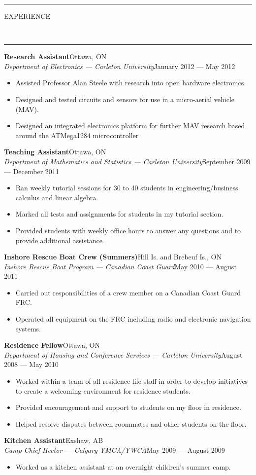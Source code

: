 \documentclass[10pt, letterpaper, oneside]{article}
\newcommand{\HRule}[2]{\textcolor{#1}{\rule{\linewidth}{#2}}}
\newcommand{\sectiontitle}[1]{\begin{minipage}{\textwidth}\HRule{black}{0.25mm}\vspace{-10pt}\begin{center}\Large\MakeUppercase{#1}\end{center}\end{minipage}\\\HRule{light-grey}{0.15mm}\vspace{\baselineskip}}
\newenvironment{ressection}[1]{
  \sectiontitle{#1}}
  {\vspace{-\baselineskip}}
\newcommand{\resitem}[1]{
    \vspace{2pt}
    \item \begin{flushleft} #1 \end{flushleft}
}
\newcommand{\resentryheader}[4]{
    \vspace{-5pt}
    \textbf{#1}\hspace{\stretch{1}}\textcolor{light-grey}{#3}\\
    \textit{#2}\hspace{\stretch{1}}\textcolor{light-grey}{#4}\\
}
\newenvironment{resentry}[4]{
  \begin{minipage}{\textwidth}
    \resentryheader{#1}{#2}{#3}{#4}
        \vspace{-\baselineskip}
    \begin{itemize}[noitemsep,nolistsep]
}{
    \end{itemize}
        \vspace{\baselineskip}
        \end{minipage}
}
\begin{document}
\begin{ressection}{experience}
  \begin{resentry}{Research Assistant}{Department of Electronics --- Carleton University}{Ottawa, ON}{January 2012 --- May 2012}
    \resitem{Assisted Professor Alan Steele with research into open hardware electronics.}
    \resitem{Designed and tested circuits and sensors for use in a micro-aerial vehicle (MAV).}
    \resitem{Designed an integrated electronics platform for further MAV research based around the ATMega1284 microcontroller}
  \end{resentry}
 
  \begin{resentry}{Teaching Assistant}{Department of Mathematics and Statistics --- Carleton University}{Ottawa, ON}{September 2009 --- December 2011}
    \resitem{Ran weekly tutorial sessions for 30 to 40 students in engineering/business calculus and linear algebra.}
    \resitem{Marked all tests and assignments for students in my tutorial section.}
    \resitem{Provided students with weekly office hours to answer any questions and to provide additional assistance.}
  \end{resentry}
 
  \begin{resentry}{Inshore Rescue Boat Crew (Summers)}{Inshore Rescue Boat Program --- Canadian Coast Guard}{Hill Is. and Brebeuf Is., ON}{May 2010 --- August 2011}
    \resitem{Carried out responsibilities of a crew member on a Canadian Coast Guard FRC.}
    \resitem{Operated all equipment on the FRC including radio and electronic navigation systems.}
  \end{resentry}
 
  \begin{resentry}{Residence Fellow}{Department of Housing and Conference Services --- Carleton University}{Ottawa, ON}{August 2008 --- May 2010}
    \resitem{Worked within a team of all residence life staff in order to develop initiatives to create a welcoming environment for residence students.}
    \resitem{Provided encouragement and support to students on my floor in residence.}
    \resitem{Helped resolve disputes between roommates and other students on the floor.}
  \end{resentry}
 
  \begin{resentry}{Kitchen Assistant}{Camp Chief Hector --- Calgary YMCA/YWCA}{Exshaw, AB}{May 2009 --- August 2009}
    \resitem{Worked as a kitchen assistant at an overnight children's summer camp.}
  \end{resentry}
 

\end{ressection}
\end{document}
